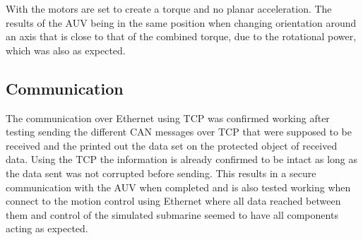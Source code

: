 With the motors are set to create a torque and no planar acceleration. The results of the AUV being in the same position when changing orientation around an axis that is close to that of the combined torque, due to the rotational power, which was also as expected.
\subsection{Communication}
The communication over Ethernet using TCP was confirmed working after testing sending the different CAN messages over TCP that were supposed to be received and the printed out the data set on the protected object of received data. Using the TCP the information is already confirmed to be intact as long as the data sent was not corrupted before sending. This results in a secure communication with the AUV when completed and is also tested working when connect to the motion control using Ethernet where all data reached between them and control of the simulated submarine seemed to have all components acting as expected. 

	

